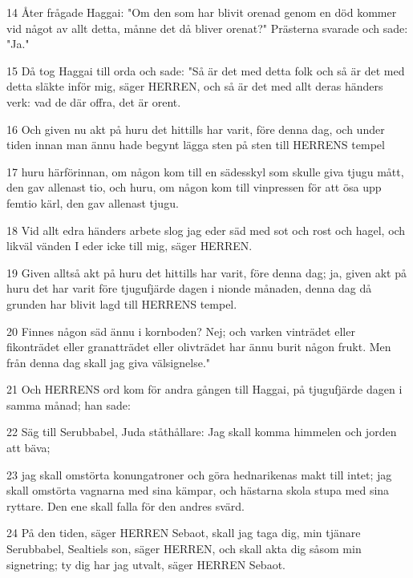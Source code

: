 \par 14 Åter frågade Haggai: "Om den som har blivit orenad genom en död kommer vid något av allt detta, månne det då bliver orenat?" Prästerna svarade och sade: "Ja."
\par 15 Då tog Haggai till orda och sade: "Så är det med detta folk och så är det med detta släkte inför mig, säger HERREN, och så är det med allt deras händers verk: vad de där offra, det är orent.
\par 16 Och given nu akt på huru det hittills har varit, före denna dag, och under tiden innan man ännu hade begynt lägga sten på sten till HERRENS tempel
\par 17 huru härförinnan, om någon kom till en sädesskyl som skulle giva tjugu mått, den gav allenast tio, och huru, om någon kom till vinpressen för att ösa upp femtio kärl, den gav allenast tjugu.
\par 18 Vid allt edra händers arbete slog jag eder säd med sot och rost och hagel, och likväl vänden I eder icke till mig, säger HERREN.
\par 19 Given alltså akt på huru det hittills har varit, före denna dag; ja, given akt på huru det har varit före tjugufjärde dagen i nionde månaden, denna dag då grunden har blivit lagd till HERRENS tempel.
\par 20 Finnes någon säd ännu i kornboden? Nej; och varken vinträdet eller fikonträdet eller granatträdet eller olivträdet har ännu burit någon frukt. Men från denna dag skall jag giva välsignelse."
\par 21 Och HERRENS ord kom för andra gången till Haggai, på tjugufjärde dagen i samma månad; han sade:
\par 22 Säg till Serubbabel, Juda ståthållare: Jag skall komma himmelen och jorden att bäva;
\par 23 jag skall omstörta konungatroner och göra hednarikenas makt till intet; jag skall omstörta vagnarna med sina kämpar, och hästarna skola stupa med sina ryttare. Den ene skall falla för den andres svärd.
\par 24 På den tiden, säger HERREN Sebaot, skall jag taga dig, min tjänare Serubbabel, Sealtiels son, säger HERREN, och skall akta dig såsom min signetring; ty dig har jag utvalt, säger HERREN Sebaot.


